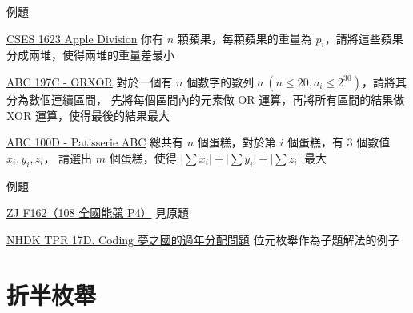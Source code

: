 \documentclass[aspectratio=169]{beamer}
\begin{document}
    \begin{frame}{例題}
        \begin{block}{\href{https://cses.fi/problemset/task/1623}{CSES 1623 Apple Division}}
            你有 $n$ 顆蘋果，每顆蘋果的重量為 $p_i$，請將這些蘋果分成兩堆，使得兩堆的重量差最小
        \end{block}

        \begin{block}{\href{https://atcoder.jp/contests/abc197/tasks/abc197_c}{ABC 197C - ORXOR}}
            對於一個有 $n$ 個數字的數列 $a\ (n \le 20, a_i \le 2^30)$，請將其分為數個連續區間，
            先將每個區間內的元素做 OR 運算，再將所有區間的結果做 XOR 運算，使得最後的結果最大
        \end{block}

        \begin{block}{\href{https://atcoder.jp/contests/abc100/tasks/abc100_d}{ABC 100D - Patisserie ABC}}
            總共有 $n$ 個蛋糕，對於第 $i$ 個蛋糕，有 $3$ 個數值 $x_i, y_i, z_i$，
            請選出 $m$ 個蛋糕，使得 $\lvert \sum{x_i} \rvert + \lvert \sum{y_i} \rvert + \lvert \sum{z_i} \rvert$ 最大
        \end{block}

    \end{frame}
    
    \begin{frame}{例題}
        \begin{block}{\href{https://zerojudge.tw/ShowProblem?problemid=f162}{ZJ F162（108 全國能競 P4）}}
            見原題
        \end{block}
        
        \begin{block}{\href{https://codeforces.com/group/H0qY3QmnOW/contest/376232/problem/D}{NHDK TPR 17D. Coding 夢之國的過年分配問題}}
            位元枚舉作為子題解法的例子
        \end{block}
    \end{frame}

    \section{折半枚舉}
\end{document}
